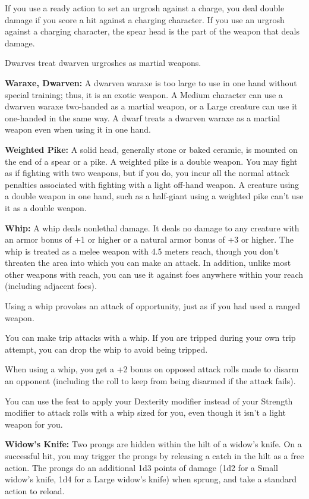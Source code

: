 If you use a ready action to set an urgrosh against a charge, you deal double damage if you score a hit against a charging character. If you use an urgrosh against a charging character, the spear head is the part of the weapon that deals damage.

Dwarves treat dwarven urgroshes as martial weapons. 

\textbf{Waraxe, Dwarven:} A dwarven waraxe is too large to use in one hand without special training; thus, it is an exotic weapon. A Medium character can use a dwarven waraxe two-handed as a martial weapon, or a Large creature can use it one-handed in the same way. A dwarf treats a dwarven waraxe as a martial weapon even when using it in one hand. 

\textbf{Weighted Pike:} A solid head, generally stone or baked ceramic, is mounted on the end of a spear or a pike. A weighted pike is a double weapon. You may fight as if fighting with two weapons, but if you do, you incur all the normal attack penalties associated with fighting with a light off-hand weapon. A creature using a double weapon in one hand, such as a half-giant using a weighted pike can't use it as a double weapon.

\textbf{Whip:} A whip deals nonlethal damage. It deals no damage to any creature with an armor bonus of +1 or higher or a natural armor bonus of +3 or higher. The whip is treated as a melee weapon with 4.5 meters reach, though you don't threaten the area into which you can make an attack. In addition, unlike most other weapons with reach, you can use it against foes anywhere within your reach (including adjacent foes).

Using a whip provokes an attack of opportunity, just as if you had used a ranged weapon.

You can make trip attacks with a whip. If you are tripped during your own trip attempt, you can drop the whip to avoid being tripped.

When using a whip, you get a +2 bonus on opposed attack rolls made to disarm an opponent (including the roll to keep from being disarmed if the attack fails).

You can use the  feat to apply your Dexterity modifier instead of your Strength modifier to attack rolls with a whip sized for you, even though it isn't a light weapon for you. 

\textbf{Widow's Knife:} Two prongs are hidden within the hilt of a widow's knife. On a successful hit, you may trigger the prongs by releasing a catch in the hilt as a free action. The prongs do an additional 1d3 points of damage (1d2 for a Small widow's knife, 1d4 for a Large widow's knife) when sprung, and take a standard action to reload.

